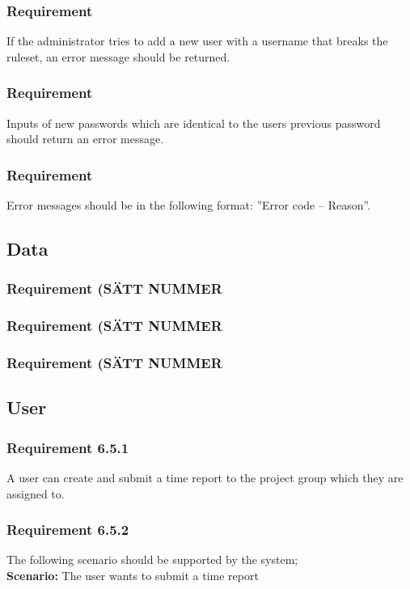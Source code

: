 \documentclass{article}
\begin{document}
\subsubsection{Requirement}
If the administrator tries to add a new user with a username that breaks the ruleset, an error message should be returned.
\subsubsection{Requirement}
Inputs of new passwords which are identical to the users previous password should return an error message. 
\subsubsection{Requirement}
Error messages should be in the following format: ”Error code – Reason”.



\subsection{Data}
\subsubsection{Requirement (SÄTT NUMMER}
\subsubsection{Requirement (SÄTT NUMMER}
\subsubsection{Requirement (SÄTT NUMMER} 

\subsection{User}
\subsubsection{Requirement 6.5.1}
A user can create and submit a time report to the project group which they are assigned to.
\subsubsection{Requirement 6.5.2}
The following scenario should be supported by the system;\\

\textbf{Scenario:} The user wants to submit a time report
\end{document}
